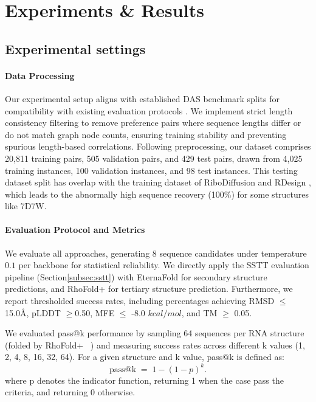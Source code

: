 \section{Experiments \& Results} %
\label{sec:experiments}

\subsection{Experimental settings} %
\label{subsec:exp_settings}

\paragraph{Data Processing}
Our experimental setup aligns with established DAS benchmark splits \citep{das2010farfar} for compatibility with existing evaluation protocols \citep{joshi2025grnade}. We implement strict length consistency filtering to remove preference pairs where sequence lengths differ or do not match graph node counts, ensuring training stability and preventing spurious length-based correlations. Following preprocessing, our dataset comprises 20,811 training pairs, 505 validation pairs, and 429 test pairs, drawn from 4,025 training instances, 100 validation instances, and 98 test instances.  This testing dataset split has overlap with the training dataset of RiboDiffusion \citep{huang2024ribodiffusion} and RDesign \citep{tanrdesign}, which leads to the abnormally high sequence recovery (100\%) for some structures like 7D7W.

\paragraph{Evaluation Protocol and Metrics}
We evaluate all approaches, generating 8 sequence candidates under temperature $0.1$ per backbone for statistical reliability. We directly apply the SSTT evaluation pipeline (Section\ref{subsec:sstt}) with EternaFold \citep{waymentsteele2022eternafold} for secondary structure predictions, and RhoFold+ \citep{shen2024accurate} for tertiary structure prediction. Furthermore, we report thresholded success rates, including percentages achieving RMSD $\leq$ 15.0\AA, pLDDT $\geq$0.50, MFE $\leq$ -8.0 $kcal/mol$, and TM $\geq$ 0.05. 

We evaluated pass@k performance \citep{lyu2024passk,wu2025invisible} by sampling 64 sequences per RNA structure (folded by RhoFold+ ~\citep{shen2024accurate}) and measuring success rates across different k values (1, 2, 4, 8, 16, 32, 64). For a given structure and k value, pass@k is defined as:
\begin{equation}
\text{pass@k} \;=\; 1-(1-p)^k .
\end{equation}
where p denotes the indicator function, returning 1 when the case pass the criteria, and returning 0 otherwise. 


